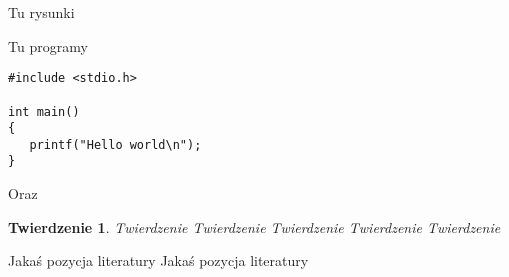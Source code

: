 \documentclass[twoside]{projektInzynierskiMS1}
\newtheorem{tw}{Twierdzenie}%
\begin{document}

Tu rysunki


Tu programy

\begin{verbatim}
#include <stdio.h>

int main()
{
   printf("Hello world\n");
}
\end{verbatim}

\noindent
Oraz 

\bigskip

\vrule\hspace{10pt}\begin{minipage}{10cm}
\end{minipage}

\begin{tw}
Twierdzenie Twierdzenie Twierdzenie Twierdzenie Twierdzenie 
\end{tw}
\begin{thebibliography}{12}

 Jakaś pozycja literatury
 Jakaś pozycja literatury

\end{thebibliography}
\end{document}
